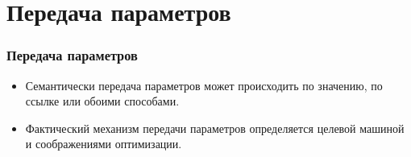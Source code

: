\documentclass[16pt,pdf,unicode]{beamer}
\begin{document}
\section{Передача параметров}
\begin{frame}
\frametitle{Передача параметров}
\begin{itemize}
  \item Семантически передача параметров может происходить по значению, по ссылке или обоими способами.
  \item Фактический механизм передачи параметров определяется целевой машиной и соображениями оптимизации.
\end{itemize}
\end{frame}
\end{document}
